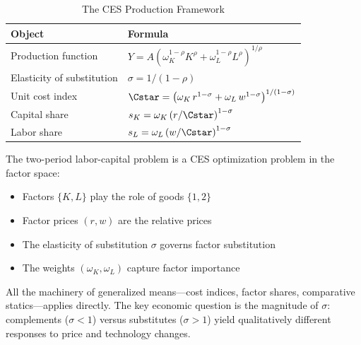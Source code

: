 \begin{table}[H]
\centering
\caption{The CES Production Framework}
\label{tab:ces-production-summary}
\renewcommand{\arraystretch}{1.6}
\begin{tabular}{@{}ll@{}}
\toprule
\textbf{Object} & \textbf{Formula} \\
\midrule
Production function & $Y = A \left( \omega_K^{1-\rho} K^\rho + \omega_L^{1-\rho} L^\rho \right)^{1/\rho}$ \\[6pt]
Elasticity of substitution & $\sigma = 1/(1-\rho)$ \\[6pt]
Unit cost index & $\Cstar = \left( \omega_K \, r^{1-\sigma} + \omega_L \, w^{1-\sigma} \right)^{1/(1-\sigma)}$ \\[6pt]
Capital share & $s_K = \omega_K \left( r / \Cstar \right)^{1-\sigma}$ \\[6pt]
Labor share & $s_L = \omega_L \left( w / \Cstar \right)^{1-\sigma}$ \\[6pt]
\bottomrule
\end{tabular}
\end{table}

\begin{callouttip}
The two-period labor-capital problem is a CES optimization problem in the factor space:
\begin{itemize}[nosep]
\item Factors $\{K, L\}$ play the role of goods $\{1, 2\}$
\item Factor prices $(r, w)$ are the relative prices
\item The elasticity of substitution $\sigma$ governs factor substitution
\item The weights $(\omega_K, \omega_L)$ capture factor importance
\end{itemize}
All the machinery of generalized means---cost indices, factor shares, comparative statics---applies directly. The key economic question is the magnitude of $\sigma$: complements ($\sigma < 1$) versus substitutes ($\sigma > 1$) yield qualitatively different responses to price and technology changes.
\end{callouttip}
